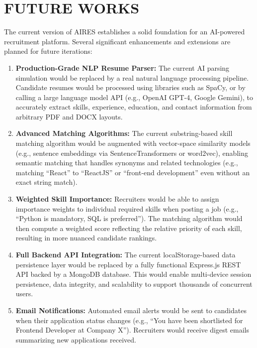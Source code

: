 \chapter{FUTURE WORKS}

The current version of AIRES establishes a solid foundation for an AI-powered recruitment platform. Several significant enhancements and extensions are planned for future iterations:

\begin{enumerate}
    \item \textbf{Production-Grade NLP Resume Parser:} The current AI parsing simulation would be replaced by a real natural language processing pipeline. Candidate resumes would be processed using libraries such as SpaCy, or by calling a large language model API (e.g., OpenAI GPT-4, Google Gemini), to accurately extract skills, experience, education, and contact information from arbitrary PDF and DOCX layouts.
    
    \item \textbf{Advanced Matching Algorithms:} The current substring-based skill matching algorithm would be augmented with vector-space similarity models (e.g., sentence embeddings via SentenceTransformers or word2vec), enabling semantic matching that handles synonyms and related technologies (e.g., matching ``React'' to ``ReactJS'' or ``front-end development'' even without an exact string match).
    
    \item \textbf{Weighted Skill Importance:} Recruiters would be able to assign importance weights to individual required skills when posting a job (e.g., ``Python is mandatory, SQL is preferred''). The matching algorithm would then compute a weighted score reflecting the relative priority of each skill, resulting in more nuanced candidate rankings.
    
    \item \textbf{Full Backend API Integration:} The current localStorage-based data persistence layer would be replaced by a fully functional Express.js REST API backed by a MongoDB database. This would enable multi-device session persistence, data integrity, and scalability to support thousands of concurrent users.
    
    \item \textbf{Email Notifications:} Automated email alerts would be sent to candidates when their application status changes (e.g., ``You have been shortlisted for Frontend Developer at Company X''). Recruiters would receive digest emails summarizing new applications received.
    

\end{enumerate}
